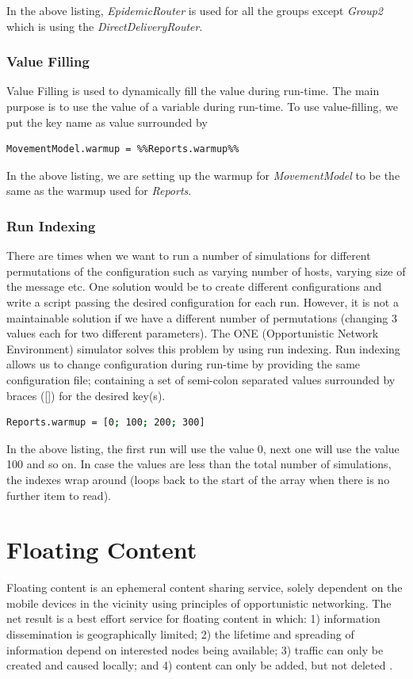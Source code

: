 In the above listing, \textit{EpidemicRouter} is used for all the groups except \textit{Group2} which is using the \textit{DirectDeliveryRouter}.


\subsubsection{Value Filling}
Value Filling is used to dynamically fill the value during run-time. The main purpose is to use the value of a variable during run-time. To use value-filling, we put the key name as value surrounded by %
\begin{lstlisting}[language=bash]
MovementModel.warmup = %%Reports.warmup%%
\end{lstlisting}

In the above listing, we are setting up the warmup for \textit{MovementModel} to be the same as the warmup used for \textit{Reports}.

\subsubsection{Run Indexing}
There are times when we want to run a number of simulations for different permutations of the configuration such as varying number of hosts, varying size of the message etc. One solution would be to create different configurations and write a script passing the desired configuration for each run. However, it is not a maintainable solution if we have a different number of permutations (changing 3 values each for two different parameters). The ONE (Opportunistic Network Environment) simulator solves this problem by using run indexing. Run indexing allows us to change configuration during run-time by providing the same configuration file;  containing a set of semi-colon separated values surrounded by braces ([]) for the desired key(s).

\begin{lstlisting}[language=bash]
Reports.warmup = [0; 100; 200; 300]
\end{lstlisting}

In the above listing, the first run will use the value 0, next one will use the value 100 and so on. In case the values are less than the total number of simulations, the indexes wrap around (loops back to the start of the array when there is no further item to read).
\newpage
\section{Floating Content}
\label{section:floating-content}
Floating content is an ephemeral content sharing service, solely dependent on the mobile devices in the vicinity using principles of opportunistic networking. The net result is a best effort service for floating content in which: 1) information dissemination is geographically limited; 2) the lifetime and spreading of information depend on interested nodes being available; 3) traffic can only be created and caused locally; and 4) content can only be added, but not deleted \cite{floating-content}.

